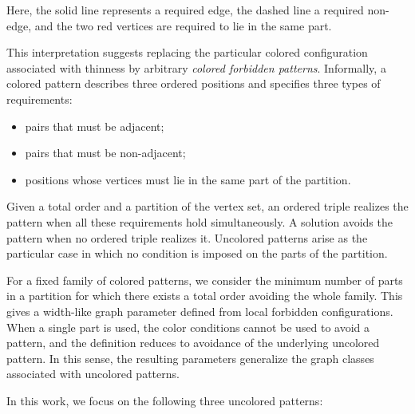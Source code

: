 \documentclass[12pt]{article}
\theoremstyle{plain}
\theoremstyle{definition}
\theoremstyle{remark}
\theoremstyle{definition}
\newcommand{\starlabel}{\mathrm{star}}
\newcommand{\biplabel}{\mathrm{bip}}
\newcommand{\forlabel}{\mathrm{for}}
\DeclareRobustCommand{\starname}{%
  \ensuremath{\mathop{\starlabel}\nolimits}%
}
\DeclareRobustCommand{\bipname}{%
  \ensuremath{\mathop{\biplabel}\nolimits}%
}
\DeclareRobustCommand{\forname}{%
  \ensuremath{\mathop{\forlabel}\nolimits}%
}
\begin{document}
Here, the solid line represents a required edge, the dashed line a
required non-edge, and the two red vertices are required to lie in the
same part.

This interpretation suggests replacing the particular colored configuration
associated with thinness by arbitrary \emph{colored forbidden patterns}.
Informally, a colored pattern describes three ordered positions and specifies
three types of requirements:
\begin{itemize}
    \item pairs that must be adjacent;
    \item pairs that must be non-adjacent;
    \item positions whose vertices must lie in the same part of the partition.
\end{itemize}

Given a total order and a partition of the vertex set, an ordered triple
realizes the pattern when all these requirements hold simultaneously. A
solution avoids the pattern when no ordered triple realizes it. Uncolored
patterns arise as the particular case in which no condition is imposed on
the parts of the partition.

For a fixed family of colored patterns, we consider the minimum number of
parts in a partition for which there exists a total order avoiding the whole
family. This gives a width-like graph parameter defined from local forbidden
configurations. When a single part is used, the color conditions cannot be
used to avoid a pattern, and the definition reduces to avoidance of the
underlying uncolored pattern. In this sense, the resulting parameters
generalize the graph classes associated with uncolored patterns.

In this work, we focus on the following three uncolored patterns:

\begin{center}
\end{center}
\end{document}
